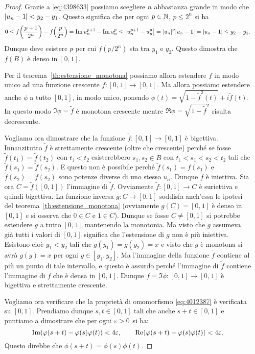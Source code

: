 \begin{proof}
Grazie a \eqref{eq:4398633} possiamo scegliere $n$ abbastanza grande in modo che 
${\left|u_n-1\right|}<y_2-y_1$. 
Questo significa che per ogni $p\in {\mathbb N}$, $p\le 2^n$ si ha 
\[
  0
  \le f{\left( \frac{p+1}{2^n} \right)} - f{\left( \frac{p}{2^n} \right)}
  = \operatorname{Im} u_n^{p+1} - \operatorname{Im} u_n^p 
  \le {\left|u_n^{p+1}-u_n^p\right|}
  = {\left|u_n\right|}^p {\left|u_n-1\right|} 
  = {\left|u_n-1\right|} \le y_2-y_1.
\]
Dunque deve esistere $p$ per cui $f(p/2^n)$ sta tra $y_1$ e $y_2$.
Questo dimostra che $f(B)$ è denso in $[0,1]$.

Per il teorema~\ref{th:estensione_monotona} possiamo allora estendere 
$f$ in modo unico ad una funzione crescente $\tilde f \colon [0,1]\to [0,1]$.
Ma allora possiamo estendere anche $\phi$ a tutto $[0,1]$,
in modo unico,
ponendo $\phi(t) = \sqrt{1-{\tilde f}^2(t)} + i \tilde f(t)$. 
In questo modo $\Im \phi = \tilde f$ è monotona crescente mentre 
$\Re \phi=\sqrt{1-{\tilde f}^2}$ risulta decrescente.

Vogliamo ora dimostrare che la funzione $\tilde f\colon [0,1]\to [0,1]$ 
è bigettiva.
Innanzitutto $\tilde f$ è strettamente crescente (oltre che crescente)
perché se fosse $\tilde f(t_1)=\tilde f(t_2)$ con $t_1<t_2$ esisterebbero 
$s_1,s_2\in B$ con $t_1<s_1<s_2<t_2$ tali che $\tilde f(s_1)=\tilde f(s_2)$.
E questo non è possibile perché $\tilde f(s_1)=f(s_1)$ e $\tilde f(s_2) = f(s_2)$ sono potenze 
diverse di uno stesso $u_n$. Dunque $\tilde f$ è iniettiva.
Sia ora $C=\tilde f([0,1])$ l'immagine di $\tilde f$. 
Ovviamente $\tilde f\colon [0,1]\to C$ è suriettiva e quindi bigettiva.
La funzione inversa $g\colon C \to [0,1]$ soddisfa anch'essa 
le ipotesi del teorema~\ref{th:estensione_monotona}
(ovviamente $g(C)=[0,1]$ è denso in $[0,1]$ e si osserva che 
$0\in C$ e $1\in C$).
Dunque se fosse $C \neq [0,1]$ si potrebbe estendere $g$ a tutto
$[0,1]$ mantenendo la monotonia. 
Ma visto che $g$ assumeva già tutti i valori di $[0,1]$ significa 
che l'estensione di $g$ non è più iniettiva.
Esistono cioè $y_1<y_2$ tali che $g(y_1)=g(y_2)=x$
e visto che $g$ è monotona si avrà $g(y)=x$ per ogni $y\in[y_1,y_2]$. 
Ma l'immagine della funzione $\tilde f$ 
contiene al più un punto di tale intervallo, e questo è assurdo 
perché l'immagine di $\tilde f$ contiene l'immagine di $f$ che 
è densa in $[0,1]$.
Dunque $f = \Im \phi\colon[0,1]\to[0,1]$ è bigettiva e strettamente 
crescente.

Vogliamo ora verificare che la proprietà di omomorfismo 
\eqref{eq:4012387} è verificata su $[0,1]$.
Prendiamo dunque $s,t\in[0,1]$ tali che anche $s+t\in [0,1]$
e puntiamo a dimostrare che per ogni $\varepsilon>0$ 
si ha:
\begin{equation}\label{eq:4438844}
  \operatorname{Im}(\varphi(s+t)- \varphi(s)\varphi(t)) < 4\varepsilon,
  \qquad
  \operatorname{Re}(\varphi(s+t)-\varphi(s)\varphi(t)) < 4\varepsilon.
\end{equation}
Questo direbbe che $\phi(s+t)=\phi(s)\phi(t)$.


\end{proof}
